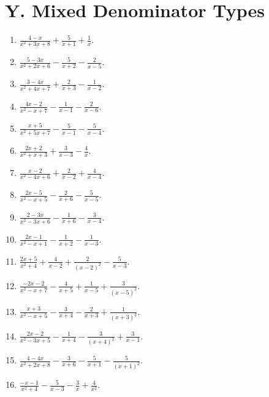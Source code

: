 \documentclass[11pt,oneside]{book}
\begin{document}
\section*{Y. Mixed Denominator Types}
\begin{enumerate}[leftmargin=*,label=\textbf{Y\arabic*.},itemsep=0.45\baselineskip]
\item $\displaystyle \frac{4 - x}{x^{2} + 3 x + 8} + \frac{5}{x + 1} + \frac{1}{x}$.
\item $\displaystyle \frac{5 - 3 x}{x^{2} + 2 x + 6} - \frac{5}{x + 2} - \frac{2}{x - 5}$.
\item $\displaystyle \frac{3 - 4 x}{x^{2} + 4 x + 7} + \frac{2}{x + 3} - \frac{1}{x - 2}$.
\item $\displaystyle \frac{4 x - 2}{x^{2} - x + 7} - \frac{1}{x - 1} - \frac{2}{x - 6}$.
\item $\displaystyle \frac{x + 5}{x^{2} + 5 x + 7} - \frac{5}{x - 1} - \frac{5}{x - 4}$.
\item $\displaystyle \frac{2 x + 2}{x^{2} + x + 3} + \frac{3}{x - 3} - \frac{4}{x}$.
\item $\displaystyle \frac{x - 2}{x^{2} - 4 x + 6} + \frac{2}{x - 2} + \frac{4}{x - 4}$.
\item $\displaystyle \frac{2 x - 5}{x^{2} - x + 5} - \frac{2}{x + 6} - \frac{5}{x - 5}$.
\item $\displaystyle \frac{2 - 3 x}{x^{2} - 3 x + 6} - \frac{1}{x + 6} - \frac{3}{x - 4}$.
\item $\displaystyle \frac{2 x - 1}{x^{2} - x + 1} - \frac{1}{x + 2} - \frac{1}{x - 3}$.
\item $\displaystyle \frac{2 x + 5}{x^{2} + 4} + \frac{4}{x - 2} + \frac{2}{\left(x - 2\right)^{2}} - \frac{5}{x - 3}$.
\item $\displaystyle \frac{- 2 x - 2}{x^{2} - x + 7} - \frac{4}{x + 5} + \frac{1}{x - 5} + \frac{3}{\left(x - 5\right)^{2}}$.
\item $\displaystyle \frac{x + 3}{x^{2} - x + 5} - \frac{3}{x + 4} - \frac{2}{x + 3} + \frac{1}{\left(x + 3\right)^{2}}$.
\item $\displaystyle \frac{2 x - 2}{x^{2} - 3 x + 5} - \frac{1}{x + 4} - \frac{3}{\left(x + 4\right)^{2}} + \frac{3}{x - 1}$.
\item $\displaystyle \frac{4 - 4 x}{x^{2} + 2 x + 8} - \frac{3}{x + 6} - \frac{5}{x + 1} - \frac{5}{\left(x + 1\right)^{2}}$.
\item $\displaystyle \frac{- x - 1}{x^{2} + 4} - \frac{5}{x - 3} - \frac{3}{x} + \frac{4}{x^{2}}$.

\end{enumerate}
\end{document}
